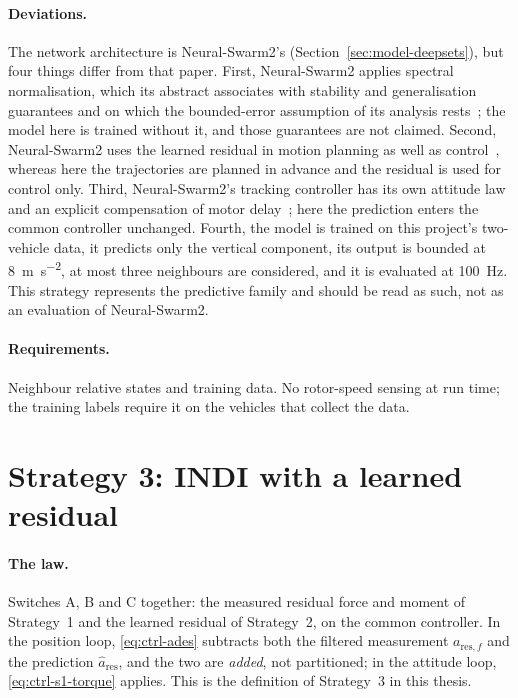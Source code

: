 \paragraph{Deviations.} The network architecture is Neural-Swarm2's
(Section~\ref{sec:model-deepsets}), but four things differ from that paper. First, Neural-Swarm2
applies spectral normalisation, which its abstract associates with stability and generalisation
guarantees and on which the bounded-error assumption of its analysis rests~\cite{shi2022neuralswarm2};
the model here is trained without it, and those guarantees are not claimed. Second, Neural-Swarm2
uses the learned residual in motion planning as well as control~\cite{shi2022neuralswarm2}, whereas
here the trajectories are planned in advance and the residual is used for control only. Third,
Neural-Swarm2's tracking controller has its own attitude law and an explicit compensation of motor
delay~\cite{shi2022neuralswarm2}; here the prediction enters the common controller unchanged.
Fourth, the model is trained on this project's two-vehicle data, it predicts only the vertical
component, its output is bounded at \SI{8}{\metre\per\second\squared}, at most three neighbours
are considered, and it is evaluated at \SI{100}{\hertz}. This strategy represents the predictive
family and should be read as such, not as an evaluation of Neural-Swarm2.

\paragraph{Requirements.} Neighbour relative states and training data. No rotor-speed sensing at
run time; the training labels require it on the vehicles that collect the data.

\section{Strategy 3: INDI with a learned residual}
\label{sec:ctrl-s3}

\paragraph{The law.} Switches A, B and C together: the measured residual force and moment of
Strategy~1 and the learned residual of Strategy~2, on the common controller. In the position loop,
\eqref{eq:ctrl-ades} subtracts both the filtered measurement $a_{\mathrm{res},f}$ and the prediction
$\hat a_{\mathrm{res}}$, and the two are \emph{added}, not partitioned; in the attitude loop,
\eqref{eq:ctrl-s1-torque} applies. This is the definition of Strategy~3 in this thesis.

